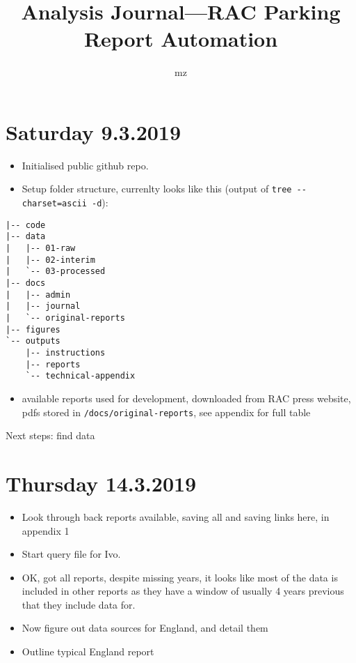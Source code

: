 \documentclass[]{article}
\title{Analysis Journal---RAC Parking Report Automation}
\author{mz}
\date{}
\providecommand{\tightlist}{%
  \setlength{\itemsep}{0pt}\setlength{\parskip}{0pt}}
\begin{document}
\maketitle

\hypertarget{saturday-9.3.2019}{%
\section{Saturday 9.3.2019}\label{saturday-9.3.2019}}

\begin{itemize}
\item
  Initialised public github repo.
\item
  Setup folder structure, currenlty looks like this (output of
  \texttt{tree\ -\/-charset=ascii\ -d}):
\end{itemize}

\begin{verbatim}
|-- code
|-- data
|   |-- 01-raw
|   |-- 02-interim
|   `-- 03-processed
|-- docs
|   |-- admin
|   |-- journal
|   `-- original-reports
|-- figures
`-- outputs
    |-- instructions
    |-- reports
    `-- technical-appendix
\end{verbatim}

\begin{itemize}
\tightlist
\item
  available reports used for development, downloaded from RAC press
  website, pdfs stored in \texttt{/docs/original-reports}, see appendix
  for full table
\end{itemize}

Next steps: find data

\hypertarget{thursday-14.3.2019}{%
\section{Thursday 14.3.2019}\label{thursday-14.3.2019}}

\begin{itemize}
\item
  Look through back reports available, saving all and saving links here,
  in appendix 1
\item
  Start query file for Ivo.
\item
  OK, got all reports, despite missing years, it looks like most of the
  data is included in other reports as they have a window of usually 4
  years previous that they include data for.
\item
  Now figure out data sources for England, and detail them
\item
  Outline typical England report
\end{itemize}
\end{document}
